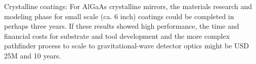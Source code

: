 Crystalline coatings: For AlGaAs crystalline mirrors, the materials research and modeling phase for small scale (ca. 6 inch) coatings could be completed in perhaps three years. If these results showed high performance, the time and financial costs for substrate and tool development and the more complex pathfinder process to scale to gravitational-wave detector optics might be USD 25M and 10 years. 


 


